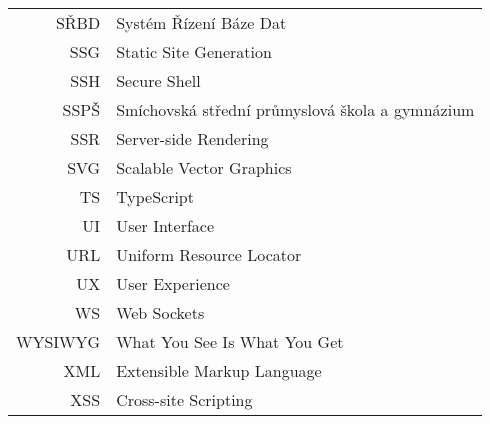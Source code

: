 \begin{longtable}{rl}
SŘBD & Systém Řízení Báze Dat\\
SSG & Static Site Generation\\
SSH & Secure Shell\\
SSPŠ & Smíchovská střední průmyslová škola a gymnázium\\
SSR & Server-side Rendering\\
SVG & Scalable Vector Graphics\\
TS & TypeScript\\
UI & User Interface\\
URL & Uniform Resource Locator\\
UX & User Experience\\
WS & Web Sockets\\
WYSIWYG & What You See Is What You Get\\
XML & Extensible Markup Language\\
XSS & Cross-site Scripting
\end{longtable}